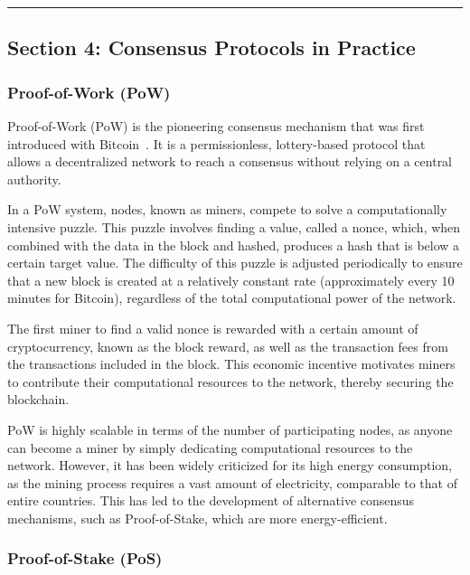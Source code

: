 \begin{center}\rule{0.5\linewidth}{0.5pt}\end{center}

\subsection{Section 4: Consensus Protocols in
	Practice}\label{section-4-consensus-protocols-in-practice}

\subsubsection{Proof-of-Work (PoW)}\label{sec:proof-of-work-pow}

Proof-of-Work (PoW) is the pioneering consensus mechanism that was first
introduced with Bitcoin~\cite{nakamoto2008bitcoin}. It is a permissionless, lottery-based protocol
that allows a decentralized network to reach a consensus without relying
on a central authority.

In a PoW system, nodes, known as miners, compete to solve a
computationally intensive puzzle. This puzzle involves finding a value,
called a nonce, which, when combined with the data in the block and
hashed, produces a hash that is below a certain target value. The
difficulty of this puzzle is adjusted periodically to ensure that a new
block is created at a relatively constant rate (approximately every 10
minutes for Bitcoin), regardless of the total computational power of the
network.

The first miner to find a valid nonce is rewarded with a certain amount
of cryptocurrency, known as the block reward, as well as the transaction
fees from the transactions included in the block. This economic
incentive motivates miners to contribute their computational resources
to the network, thereby securing the blockchain.

PoW is highly scalable in terms of the number of participating nodes, as
anyone can become a miner by simply dedicating computational resources
to the network. However, it has been widely criticized for its high
energy consumption, as the mining process requires a vast amount of
electricity, comparable to that of entire countries. This has led to the
development of alternative consensus mechanisms, such as Proof-of-Stake,
which are more energy-efficient.

\subsubsection{Proof-of-Stake (PoS)}\label{proof-of-stake-pos}

